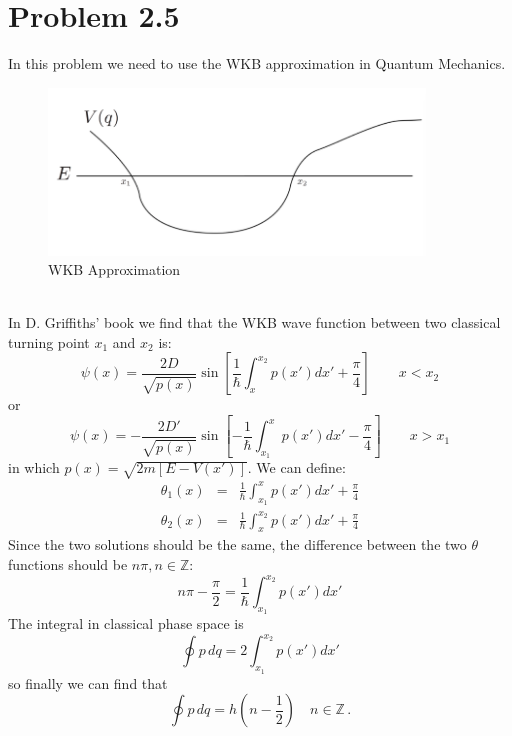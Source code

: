 \documentclass{article}
\begin{document}
\section*{Problem 2.5}
In this problem we need to use the WKB approximation in Quantum Mechanics. 
\begin{figure}[!htp]
\centering
\includegraphics[width=10cm]{./figures/2.3-2.5/pic1.png}
\caption{WKB Approximation}
\end{figure}\\
In D. Griffiths' book we find that the WKB wave function between two classical turning point $x_1$ and $x_2$ is:
$$
\psi(x) = \frac{2D}{\sqrt{p(x)}}\sin\left[\frac{1}{\hbar}\int_x^{x_2}p(x')dx' + \frac{\pi}{4}\right]\quad\quad x< x_2
$$
or
$$
\psi(x) = -\frac{2D'}{\sqrt{p(x)}}\sin\left[-\frac{1}{\hbar}\int_{x_1}^{x}p(x')dx'-\frac{\pi}{4}\right]\quad\quad x>x_1
$$
in which $p(x) = \sqrt{2m[E-V(x')]}$. We can define:
\begin{eqnarray*}
\theta_1(x) &=& \frac{1}{\hbar}\int_{x_1}^{x}p(x')dx'+\frac{\pi}{4}\\
\theta_2(x) &=& \frac{1}{\hbar}\int_x^{x_2}p(x')dx' + \frac{\pi}{4}
\end{eqnarray*}
Since the two solutions should be the same, the difference between the two $\theta$ functions should be $n\pi, n\in\mathbb{Z}$: 
\begin{equation}
n\pi-\frac{\pi}{2} = \frac{1}{\hbar}\int_{x_1}^{x_2}p(x')dx'
\end{equation}
The integral in classical phase space is
$$
\oint p\,dq = 2 \int_{x_1}^{x_2}p(x')dx'
$$
so finally we can find that 
\begin{equation}
\oint p\,dq = h\left(n-\frac{1}{2}\right)\quad n\in\mathbb{Z}\,.
\end{equation}
\end{document}
